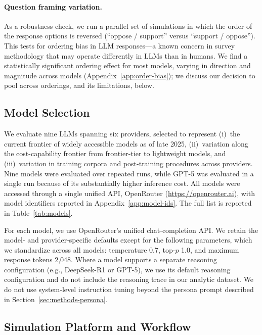 \documentclass[12pt]{article}
\begin{document}
\paragraph{Question framing variation.} As a robustness check, we run a parallel set of simulations in which the order of the response options is reversed (``oppose / support'' versus ``support / oppose''). This tests for ordering bias in LLM responses---a known concern in survey methodology that may operate differently in LLMs than in humans. We find a statistically significant ordering effect for most models, varying in direction and magnitude across models (Appendix~\ref{app:order-bias}); we discuss our decision to pool across orderings, and its limitations, below.

\subsection{Model Selection}\label{sec:methods-models}

We evaluate nine LLMs spanning six providers, selected to represent
(i)~the current frontier of widely accessible models as of late 2025,
(ii)~variation along the cost-capability frontier from frontier-tier to
lightweight models, and (iii)~variation in training corpora and
post-training procedures across providers. Nine models were evaluated
over repeated runs, while GPT-5 was evaluated in a single run because
of its substantially higher inference cost. All models were accessed
through a single unified API, OpenRouter
(\url{https://openrouter.ai}), with model identifiers reported in
Appendix~\ref{app:model-ids}. The full list is reported in
Table~\ref{tab:models}.


For each model, we use OpenRouter's unified chat-completion API. We retain
the model- and provider-specific defaults except for the following
parameters, which we standardize across all models: temperature 0.7,
top-$p$ 1.0, and maximum response tokens 2{,}048. Where a model supports
a separate reasoning configuration (e.g., DeepSeek-R1 or GPT-5), we use
its default reasoning configuration and do not include the reasoning trace
in our analytic dataset. We do not use system-level instruction tuning
beyond the persona prompt described in
Section~\ref{sec:methods-persona}.

\subsection{Simulation Platform and Workflow}\label{sec:methods-platform}
\end{document}
